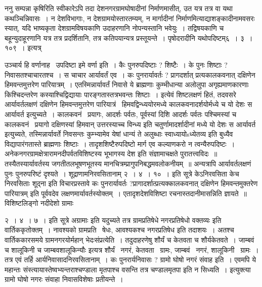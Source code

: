 \documentclass[11pt, openany]{book}
\begin{document}
ननु सम्पन्ना कृषिरिति स्वीकारेऽपि तदा देशनगरग्रामघोषादीनां निर्माणमासीत्, उत यत्र तत्र वा यथा कथञ्चिन्निवासः~। न देशविभागाः, न देशग्रामयोस्तारतम्यम्, न मार्गादीनां निर्माणमित्याद्याशङ्कादीनामवसरः स्यात्, यदि भाष्यकृता देशग्रामविषयकाणि उदाहरणानि नोपन्यस्तानि भवेयुः~। तद्विषयकाणि च बहून्युदाहूरणानि यत्र तत्र प्रदर्शितानि, तत्र कतिपयान्यत्र प्रस्तूयन्ते~। पृषोदरादीनि यथोपदिष्टम्६~। ३~। १०९~। इत्यत्र् {\qt उञ्चार्य हि वर्णानाह \textendash\ उपदिष्टा इमे वर्णा इति~। कैः पुनरुपदिष्टाः ? शिष्टैः~। के पुनः शिष्टाः ? निवासतश्चाचारतश्च~। स चाचार आर्यावर्तं एव~। कः पुनरार्यावर्तः ? प्रागदर्शात् प्रत्यकालकवनात् दक्षिणेन हिमवन्तमुत्तरेण पारियात्रम्~। एतस्मिन्नार्यावर्तं निवासे ये ब्राह्मणाः कुम्भीधान्या अलोलुपा अगृह्यमाणकारणाः किश्चिदन्तरेण कस्याश्चिद्विद्यायाः पारङ्गतास्तत्रभवन्तः शिष्टाः~। इत्येवं शिष्टलक्षणं हितं, तदवसरे आर्यावर्तलक्षणं दक्षिणेन हिमवन्तमुत्तरेण पारियात्रं \textendash\ हिमवद्विन्ध्ययोरमध्ये कालकवनादर्शयोर्मध्ये च यो देशः स आर्यावर्त इत्युच्यते~। कालकवनं \textendash\ प्रयागः, आदर्शः पर्वतः, पूर्वस्यां दिशि आदर्शः पर्वतः पश्चिमस्यां च कालकवनं \textendash\ प्रयागो दक्षिणस्यां हिमवान् उत्तरस्याच्च विन्ध्य इति चतुर्णामादर्शादीनां मध्ये यो देशः स आर्यावर्त इत्युच्यते, तस्मिन्नार्यावर्ते निवसन्तः कुम्भ्यामेव येषां धान्यं ते अलुब्धाः स्वाध्यायोsध्येतव्य इति बुध्यैव विद्यापारंगतास्ते ब्राह्मणाः शिष्टाः~। तादृशशिष्टैरुपदिष्टो मार्ग एव कल्याणकरो न त्वन्यैरुपदिष्टः~। अनेकनगरग्रामक्षेत्रारामनदीपर्वतविशिष्टस्य भूभागस्य देश इति संज्ञामाचक्षते पुरातत्त्वविदः~॥ तस्यैतस्यार्यावर्तस्य जगतीतलभूषणभूतस्य मानचित्रम्प्रागुपनिबद्धमवलोकनीयम्~॥ अन्यत्रापि आर्यावर्तलक्षणं पुनः पुनरुपरिष्टं दृश्यते~। शूद्राणामनिरवसितानाम् २~। ४~। १०~। इति सूत्रे केऽनिरवसिता केच निरवसिताः शूद्ना इति विचारप्रस्तावे {\qt कः पुनरार्यावर्तः ?प्रागादर्शात्प्रत्यक्कालकवनात् दक्षिणेन हिमवन्तमुक्तरेण पारियात्रम्} इति पूर्ववदेव लक्षणमार्यावर्तस्योक्तम्~। एतादृशदेशविशिष्टा रचनास्तदानीमासन्निति ज्ञायते~॥ विशिष्टलिङ्गो नदीदेशो ग्रामाः

\newpage

\noindent
२~। ४~। ७~। इति सूत्रे {\qt अग्रामाः} इति यदुच्यते तत्र ग्रामप्रतिषेधे नगरप्रतिषेधो वक्तव्यः इति वार्तिककृतोक्तम्~। नावश्यको ग्रामप्रति \textendash\ षेधः, आवश्यकश्च नगरप्रतिषेध इति तदाशयः~। अतश्च वार्तिककारसमये ग्रामनगरयोर्महान् भेदःसंप्रत्येति~। तदुदाहरणेषु {\qt शौर्यं च केतवता च शौर्यकेतवते}~। जाम्बवं च शालूकिनी च जाम्बवशालूकिन्यौः इत्यत्र शौर्यं \textendash\ नगरं, केतवता \textendash\ ग्रामः, जाम्बवं \textendash\ नगरं, शालूकिनी \textendash\ ग्रामः~। तत्र एवं तर्हि आर्यनिवासादनिरवसितानाम्~। कः पुनरार्यनिवासः ? ग्रामो घोषो नगरं संवाह इति~। एवमपि ये महान्तः संस्त्यायास्तेष्वभ्यन्तराश्चण्डाला मृतपाश्च वसन्ति तत्र चण्डालमृतपा इति न सिध्यति~। इत्युक्त्या ग्रामो घोषो नगरः संवाहा निवासविशेषाः प्रतीयन्ते~।\\

}
\end{document}
